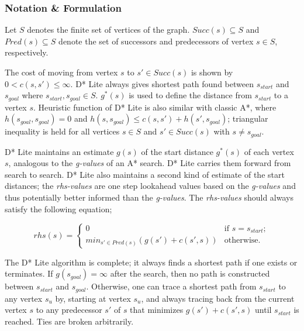 \documentclass[10pt,journal]{IEEEtran}
\begin{document}
\subsubsection{Notation \& Formulation}
Let $S$ denotes the finite set of vertices of the graph. $Succ(s) \subseteq S$ and $Pred(s) \subseteq S$ denote the set of successors and predecessors of vertex $s \in S$, respectively. 

The cost of moving from vertex $s$ to $s' \in Succ(s)$ is shown by $0 < c(s, s') \leq \infty$. D* Lite always gives shortest path found between $s_{start}$ and $s_{goal}$ where $s_{start}, s_{goal} \in S$. $g^*(s)$ is used to define the distance from $s_{start}$ to a vertex $s$. Heuristic function of D* Lite is also similar with classic A*, where $h(s_{goal}, s_{goal}) = 0$ and $h(s, s_{goal}) \leq c(s, s') + h(s', s_{goal})$; triangular inequality is held for all vertices $s \in S$ and $s' \in Succ(s)$ with $s \neq s_{goal}$.

D* Lite maintains an estimate $g(s)$ of the start distance $g^*(s)$ of each vertex $s$, analogous to the \textit{g-values} of an A* search. D* Lite carries them forward from search to search. D* Lite also maintains a second kind of estimate of the start distances; the \textit{rhs-values} are one step lookahead values based on the \textit{g-values} and thus potentially better informed than the \textit{g-values}. The \textit{rhs-values} should always satisfy the following equation;

\[ rhs(s) = \left\{ \begin{array}{cc}
0 & \mbox{if $s=s_{start}$};\\
min_{s' \in Pred(s)}(g(s') + c(s', s)) & \mbox{otherwise}.\end{array} \right. \] 


The D* Lite algorithm is complete; it always finds a shortest path if one exists or terminates. If $g(s_{goal}) = \infty$ after the search, then no path is constructed between $s_{start}$ and $s_{goal}$. Otherwise, one can trace a shortest path from $s_{start}$ to any vertex $s_{u}$ by, starting at vertex $s_{u}$, and always tracing back from the current vertex $s$ to any predecessor $s'$ of $s$ that minimizes $g(s') + c(s', s)$ until $s_{start}$ is reached. Ties are broken arbitrarily.
\end{document}
